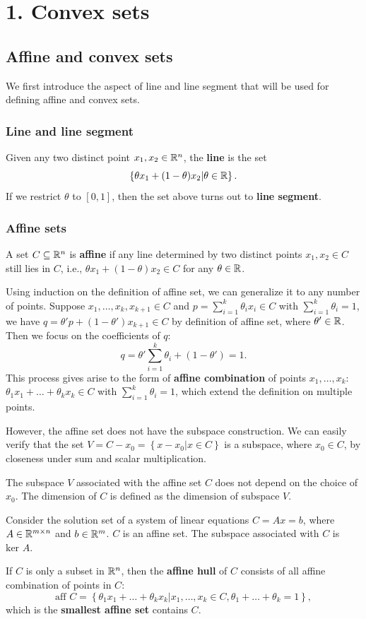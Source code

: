 
\section[Chapter 1. Convex sets]{1. Convex sets}

\subsection{Affine and convex sets}
We first introduce the aspect of line and line segment that will be used for defining affine and convex sets.
\subsubsection{Line and line segment}
Given any two distinct point $x_1, x_2 \in \mathbb{R}^n$, the \textbf{line} is the set 
\[
\left\{ \theta x_1 + (1-\theta) x_2 | \theta \in \mathbb{R} \right\}.
\]
If we restrict $\theta$ to $[0, 1]$, then the set above turns out to \textbf{line segment}.

\subsubsection{Affine sets}
A set $C \subseteq \mathbb{R}^n$ is \textbf{affine} if any line determined by two distinct points $x_1, x_2 \in C$ still lies in $C$, i.e., $\theta x_1 + (1-\theta) x_2 \in C$ for any $\theta \in \mathbb{R}$.

Using induction on the definition of affine set, we can generalize it to any number of points. Suppose $x_1,\dots,x_k, x_{k+1} \in C$ and $p=\sum_{i=1}^{k}\theta_i x_i \in C$ with $\sum_{i=1}^{k}\theta_i=1$, we have $q=\theta' p + (1 - \theta') x_{k+1} \in C$ by definition of affine set, where $\theta' \in \mathbb{R}$. Then we focus on the coefficients of $q$:
\[
q=\theta'\sum_{i=1}^{k}\theta_i + (1 - \theta')=1.
\]
This process gives arise to the form of \textbf{affine combination} of points $x_1,\dots, x_k$: $\theta_1 x_1 + \dots + \theta_k x_k \in C$ with $\sum_{i=1}^{k}\theta_i=1$, which extend the definition on multiple points.

However, the affine set does not have the subspace construction. We can easily verify that the set $V=C-x_0=\left\{x - x_0|x\in C\right\}$ is a subspace, where $x_0\in C$, by closeness under sum and scalar multiplication. 

The subspace $V$ associated with the affine set $C$ does not depend on the choice of $x_0$. The dimension of $C$ is defined as the dimension of subspace $V$.
\begin{example}
    Consider the solution set of a system of linear equations $C={Ax=b}$, where $A\in \mathbb{R}^{m\times n}$ and $b\in \mathbb{R}^m$. $C$ is an affine set. The subspace associated with $C$ is $\text{ker } A$.
\end{example}
If $C$ is only a subset in $\mathbb{R}^n$, then the \textbf{affine hull} of $C$ consists of all affine combination of points in $C$:
\[
\text{aff } C=\left\{\theta_1 x_1 + \dots + \theta_k x_k| x_1,\dots,x_k \in C, \theta_1+\dots+\theta_k = 1\right\},
\]
which is the \textbf{smallest affine set} contains $C$.

